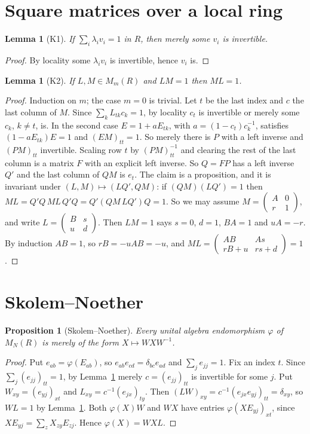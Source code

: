 \documentclass[11pt]{amsart}
\newtheorem{lemma}[theorem]{Lemma}
\newtheorem{proposition}[theorem]{Proposition}
\theoremstyle{definition}
\theoremstyle{remark}
\newcommand{\M}{M_N(R)}
\begin{document}
\section{Square matrices over a local ring}

\begin{lemma}[K1]\label{lem:K1}
If $\sum_i\lambda_iv_i=1$ in $R$, then merely some $v_i$ is invertible.
\end{lemma}
\begin{proof}
By locality some $\lambda_iv_i$ is invertible, hence $v_i$ is.
\end{proof}

\begin{lemma}[K2]\label{lem:K2}
If $L,M\in M_m(R)$ and $LM=1$ then $ML=1$.
\end{lemma}
\begin{proof}
Induction on $m$; the case $m=0$ is trivial. Let $t$ be the last index and
$c$ the last column of $M$. Since $\sum_kL_{tk}c_k=1$, by locality $c_t$ is
invertible or merely some $c_k$, $k\neq t$, is. In the second case
$E=1+aE_{tk}$, with $a=(1-c_t)c_k^{-1}$, satisfies $(1-aE_{tk})E=1$ and
$(EM)_{tt}=1$. So merely there is $P$ with a left inverse and $(PM)_{tt}$
invertible. Scaling row $t$ by $(PM)_{tt}^{-1}$ and clearing the rest of
the last column is a matrix $F$ with an explicit left inverse. So $Q=FP$
has a left inverse $Q'$ and the last column of $QM$ is $e_t$. The claim is
a proposition, and it is invariant under $(L,M)\mapsto(LQ',QM)$: if
$(QM)(LQ')=1$ then $ML=Q'Q\,ML\,Q'Q=Q'(QM\,LQ')Q=1$. So we may assume
$M=\begin{pmatrix}A&0\\ r&1\end{pmatrix}$, and write
$L=\begin{pmatrix}B&s\\ u&d\end{pmatrix}$. Then $LM=1$ says $s=0$, $d=1$,
$BA=1$ and $uA=-r$. By induction $AB=1$, so $rB=-uAB=-u$, and
$ML=\begin{pmatrix}AB&As\\ rB+u&rs+d\end{pmatrix}=1$.
\end{proof}

\section{Skolem--Noether}

\begin{proposition}[Skolem--Noether]\label{prop:sn}
Every unital algebra endomorphism $\varphi$ of $\M$ is merely of the form
$X\mapsto WXW^{-1}$.
\end{proposition}
\begin{proof}
Put $e_{ab}=\varphi(E_{ab})$, so $e_{ab}e_{cd}=\delta_{bc}e_{ad}$ and
$\sum_je_{jj}=1$. Fix an index $t$. Since $\sum_j(e_{jj})_{tt}=1$, by
Lemma~\ref{lem:K1} merely $c=(e_{jj})_{tt}$ is invertible for some $j$. Put
$W_{xy}=(e_{yj})_{xt}$ and $L_{xy}=c^{-1}(e_{jx})_{ty}$. Then
$(LW)_{xy}=c^{-1}(e_{jx}e_{yj})_{tt}=\delta_{xy}$, so $WL=1$ by
Lemma~\ref{lem:K2}. Both $\varphi(X)W$ and $WX$ have entries
$\varphi(XE_{yj})_{xt}$, since $XE_{yj}=\sum_zX_{zy}E_{zj}$. Hence
$\varphi(X)=WXL$.
\end{proof}
\end{document}
